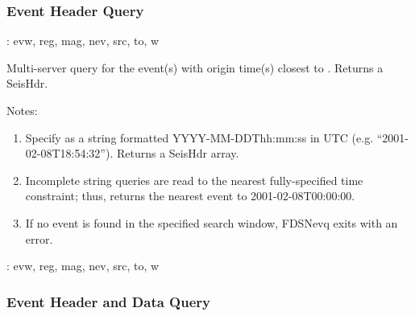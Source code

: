 \documentclass[letterpaper,11pt,english]{sphinxmanual}
\begin{document}
\subsubsection{Event Header Query}
\label{\detokenize{src/Web/webclients:event-header-query}}

\begin{fulllineitems}
\end{fulllineitems}


{\hyperref[\detokenize{src/Appendices/keywords:dkw}]{}}: evw, reg, mag, nev, src, to, w

Multi-server query for the event(s) with origin time(s) closest to . Returns
a SeisHdr.

Notes:
\begin{enumerate}
\def\theenumi{\arabic{enumi}}
\def\labelenumi{\theenumi .}
\makeatletter\def\p@enumii{\p@enumi \theenumi .}\makeatother
\item {} 
Specify  as a string formatted YYYY-MM-DDThh:mm:ss in UTC (e.g. “2001-02-08T18:54:32”). Returns a SeisHdr array.

\item {} 
Incomplete string queries are read to the nearest fully-specified time constraint; thus,  returns the nearest event to 2001-02-08T00:00:00.

\item {} 
If no event is found in the specified search window, FDSNevq exits with an error.

\end{enumerate}

\begin{DUlineblock}{0em}
\item[] {\hyperref[\detokenize{src/Appendices/keywords:dkw}]{}}: evw, reg, mag, nev, src, to, w
\end{DUlineblock}


\subsubsection{Event Header and Data Query}
\label{\detokenize{src/Web/webclients:event-header-and-data-query}}

\begin{fulllineitems}
\end{fulllineitems}
\end{document}
